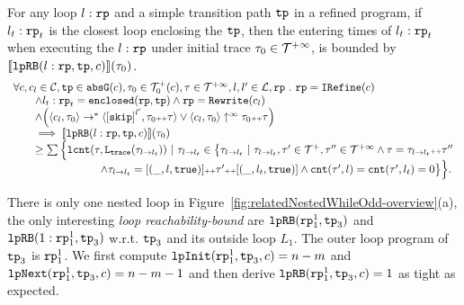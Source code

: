 \begin{lem}
  \label{lem:looprb-sound}
  For any loop $l: \mathtt{rp}$ and a simple transition path $\mathtt{tp}$ in a refined program, if $l_t: \mathtt{rp}_t$ is the closest loop enclosing the $\mathtt{tp}$, then the entering times of $l_t: \mathtt{rp}_t$ when executing the $l: \mathtt{rp}$ under initial trace $\mathtt{\tau}_0 \in \mathcal{T}^{+\infty}$, is bounded by $\llbracket \mathtt{lpRB}(l: \mathtt{rp}, \mathtt{tp}, c) \rrbracket(\mathtt{\tau}_0)$.
  \[
    \begin{array}{l}
    \forall c, c_l \in \cdom, \tpath \in \absG(c), \trace_0 \in \ftdom_0(c), \trace \in \tdom, l, l' \in \ldom, \rprog \st 
    \rprog = \kw{IRefine}(c)
    \\ \qquad
    \land l_t: \rprog_t = \kw{enclosed}(\rprog, \tpath)
    \land 
    \rprog = \algrewrite(c_l)
    \\ \qquad
    \land
    \Big(
    \config{c_l, \trace_0} \to^* \config{\clabel{\eskip}^{l'}, \trace_0 \tracecat \trace}
    \lor \config{c_l, \trace_0} \uparrow^{\infty} \trace_0 \tracecat \trace 
    \Big)
    \\ \qquad
    \implies
    \econfig{\lpchB(l: \rprog, \tpath, c)}(\trace_0) 
    \\ \qquad \geq 
      \sum\Big\{
      \lcounter(\trace, \tracel(\trace_{l \to l_t})) ~\vert~ \trace_{l \to l_t} \in 
      \big\{\trace_{l \to l_t} ~\vert~ 
      \trace_{l \to l_t}, \trace' \in \ftdom, \trace'' \in \tdom
      \land \trace = \trace_{l \to l_t} \tracecat \trace''
      \\ \qquad \qquad \qquad \qquad
      \land \trace_{l \to l_t} = [(\_, l, \etrue)] \tracecat \trace' \tracecat [(\_, l_t, \etrue)]
      \land \counter(\trace', l) = \counter(\trace', l_t) = 0 
      \big\}
      \Big\}.
\end{array}
  \]
\end{lem}

There is only one nested loop in Figure~\ref{fig:relatedNestedWhileOdd-overview}(a),
the only interesting \emph{loop reachability-bound} are $\mathtt{lpRB}(\mathtt{rp}_1^1, \mathtt{tp}_3)$ and $\mathtt{lpRB}(1: \mathtt{rp}_1^1, \mathtt{tp}_3)$ 
w.r.t. $\mathtt{tp}_3$ and its outside loop $L_1$.
The outer loop program of $\mathtt{tp}_3$ is $\mathtt{rp}_1^1$.
We first compute $\mathtt{lpInit}(\mathtt{rp}_1^1, \mathtt{tp}_3, c) = n - m $ and $\mathtt{lpNext}(\mathtt{rp}_1^1, \mathtt{tp}_3, c) = n - m - 1$ and then derive $\mathtt{lpRB}(\mathtt{rp}_1^1, \mathtt{tp}_3, c) = 1$ as tight as expected.

